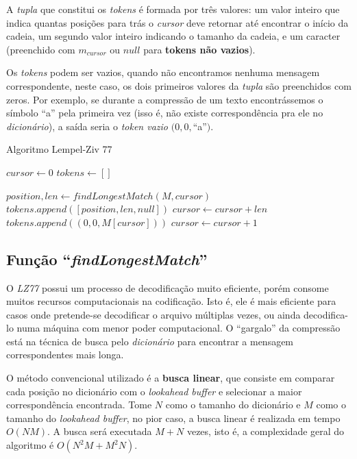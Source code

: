 A \emph{tupla} que constitui os \emph{tokens} é formada por três valores:
um valor inteiro que indica quantas posições para trás o \emph{cursor} deve retornar até encontrar o início da cadeia, 
um segundo valor inteiro indicando o tamanho da cadeia,
e um caracter (preenchido com $m_{cursor}$ ou $null$ para \textbf{tokens não vazios}).

Os \emph{tokens} podem ser vazios, quando não encontramos nenhuma mensagem correspondente, neste caso, os dois primeiros valores da \emph{tupla} são preenchidos com zeros.
Por exemplo, se durante a compressão de um texto encontrássemos o símbolo ``a'' pela primeira vez (isso é, não existe correspondência pra ele no \emph{dicionário}), a saída seria o \emph{token vazio} $(0, 0, $``a''$)$.

\begin{algorithm}[H]
\caption{Algoritmo Lempel-Ziv 77} \label{alg:lz77}
\begin{algorithmic}

	\State $cursor \gets 0$
	\State $tokens \gets []$

		\State $position, len \gets findLongestMatch(M, cursor)$ 
		 
			\State $tokens.append([position, len, null])$
			\State $cursor \gets cursor + len$
		\Else
			\State $tokens.append((0, 0, M[cursor]))$ 
			\State $cursor \gets cursor + 1$
		\EndIf
	\EndWhile
\end{algorithmic}
\end{algorithm}

\subsection{Função ``\emph{findLongestMatch}'' }
O \emph{LZ77} possui um processo de decodificação muito eficiente, porém consome muitos recursos computacionais na codificação. 
Isto é, ele é mais eficiente para casos onde pretende-se decodificar o arquivo múltiplas vezes, ou ainda decodifica-lo numa máquina com menor poder computacional. 
O ``gargalo'' da compressão está na técnica de busca pelo \emph{dicionário} para encontrar a mensagem correspondentes mais longa.

O método convencional utilizado é a \textbf{busca linear}, que consiste em comparar cada posição no dicionário com o \emph{lookahead buffer} e selecionar a maior correspondência encontrada. 
Tome $N$ como o tamanho do dicionário e $M$ como o tamanho do \emph{lookahead buffer}, no pior caso, a busca linear é realizada em tempo $O(NM)$. 
A busca será executada $M + N$ vezes, isto é, a complexidade geral do algoritmo é $O( N^{2}M + M^{2}N)$.


